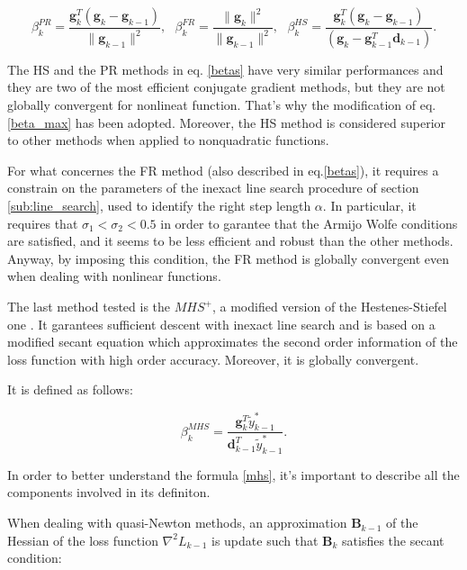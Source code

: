 			\begin{equation}
			\label{betas}
				 \beta^{PR}_k = \frac{\textbf{g}_k^T(\textbf{g}_k-\textbf{g}_{k-1})}{\|\textbf{g}_{k-1}\|^2}, \text{ }
 				 \beta^{FR}_k = \frac{\|\textbf{g}_{k}\|^2}{\|\textbf{g}_{k-1}\|^2}, \text{ }
 				 \beta^{HS}_k = \frac{\textbf{g}_k^T(\textbf{g}_k-\textbf{g}_{k-1})}{(\textbf{g}_k-\textbf{g}_{k-1}^T\textbf{d}_{k-1})}.
			\end{equation}

			The HS and the PR methods in eq. \ref{betas} have very similar performances and they are two of the most efficient conjugate gradient methods, but they are not globally convergent for nonlineat function. That's why the modification of eq. \ref{beta_max} has been adopted.
			Moreover, the HS method is considered superior to other methods when applied to nonquadratic functions.

			For what concernes the FR method (also described in eq.\ref{betas}), it requires a constrain on the parameters of the inexact line search procedure of section \ref{sub:line_search}, used to identify the right step length $\alpha$. In particular, it requires that $\sigma_1 < \sigma_2 < 0.5$ in order to garantee that the Armijo Wolfe conditions are satisfied, and it seems to be less efficient and robust than the other methods.%
			Anyway, by imposing this condition, the FR method is globally convergent even when dealing with nonlinear functions.

			The last method tested is the $MHS^+$, a modified version of the Hestenes-Stiefel one \cite{LIVIERIS2013491}. 
			It garantees sufficient descent with inexact line search and is based on a modified secant equation which approximates the second order information of the loss function with high order accuracy. Moreover, it is globally convergent.

			It is defined as follows:

			\begin{equation}
			\label{mhs}
 				 \beta^{MHS}_k = \frac{\mathbf{g}_k^T \widetilde{y}_{k-1}^*}{\mathbf{d}_{k-1}^T\widetilde{y}_{k-1}^*}.
			\end{equation}

			In order to better understand the formula \ref{mhs}, it's important to describe all the components involved in its definiton.

			When dealing with quasi-Newton methods, an approximation $\textbf{B}_{k-1}$ of the Hessian of the loss function $\nabla^2\textit{L}_{k-1}$ is update such that $\textbf{B}_k$ satisfies the secant condition:

